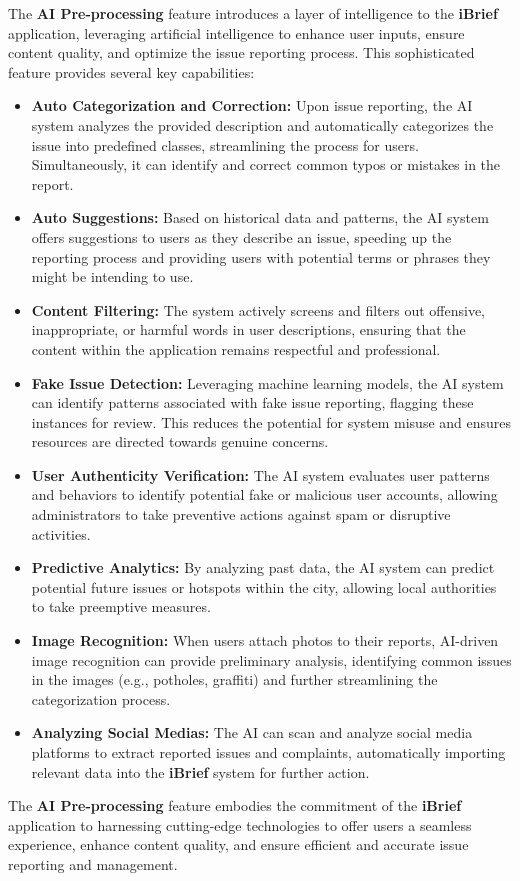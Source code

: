 The \textbf{\gls{AI} Pre-processing} feature introduces a layer of intelligence to the \textbf{iBrief} application, leveraging artificial intelligence to enhance user inputs, ensure content quality, and optimize the issue reporting process. This sophisticated feature provides several key capabilities:

\begin{itemize}
    \item \textbf{Auto Categorization and Correction:} Upon issue reporting, the \gls{AI} system analyzes the provided description and automatically categorizes the issue into predefined classes, streamlining the process for users. Simultaneously, it can identify and correct common typos or mistakes in the report.
    
    \item \textbf{Auto Suggestions:} Based on historical data and patterns, the \gls{AI} system offers suggestions to users as they describe an issue, speeding up the reporting process and providing users with potential terms or phrases they might be intending to use.
    
    \item \textbf{Content Filtering:} The system actively screens and filters out offensive, inappropriate, or harmful words in user descriptions, ensuring that the content within the application remains respectful and professional.
    
    \item \textbf{Fake Issue Detection:} Leveraging machine learning models, the \gls{AI} system can identify patterns associated with fake issue reporting, flagging these instances for review. This reduces the potential for system misuse and ensures resources are directed towards genuine concerns.
    
    \item \textbf{User Authenticity Verification:} The \gls{AI} system evaluates user patterns and behaviors to identify potential fake or malicious user accounts, allowing administrators to take preventive actions against spam or disruptive activities.
    
    \item \textbf{Predictive Analytics:} By analyzing past data, the \gls{AI} system can predict potential future issues or hotspots within the city, allowing local authorities to take preemptive measures.
    
    \item \textbf{Image Recognition:} When users attach photos to their reports, \gls{AI}-driven image recognition can provide preliminary analysis, identifying common issues in the images (e.g., potholes, graffiti) and further streamlining the categorization process.

    \item \textbf{Analyzing Social Medias:} The \gls{AI} can scan and analyze social media platforms to extract reported issues and complaints, automatically importing relevant data into the \textbf{iBrief} system for further action.
\end{itemize}

The \textbf{\gls{AI} Pre-processing} feature embodies the commitment of the \textbf{iBrief} application to harnessing cutting-edge technologies to offer users a seamless experience, enhance content quality, and ensure efficient and accurate issue reporting and management.
